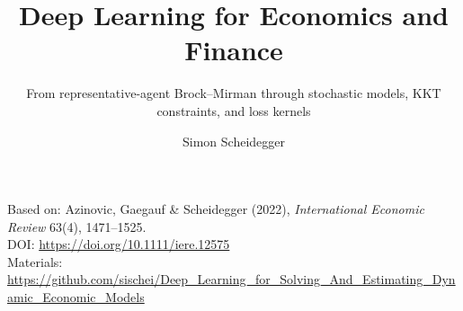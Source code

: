 \documentclass[aspectratio=169,11pt]{beamer}
\title[Deep Learning for Dynamic Economic Models]
{Deep Learning for Economics and Finance}
\subtitle{From representative-agent Brock--Mirman through stochastic models, KKT constraints, and loss kernels}
\author{Simon Scheidegger}
\institute[HEC Lausanne]{HEC, University of Lausanne}
\date{}
\begin{document}

{
\begin{frame}
\titlepage
\vspace{-0.4cm}
\begin{center}
{\footnotesize Based on: Azinovic, Gaegauf \& Scheidegger (2022), \emph{International Economic Review} 63(4), 1471--1525.\\
DOI: \url{https://doi.org/10.1111/iere.12575}}\\[4pt]
{\footnotesize Materials: \url{https://github.com/sischei/Deep_Learning_for_Solving_And_Estimating_Dynamic_Economic_Models}}
\end{center}
\end{frame}
}
\end{document}
